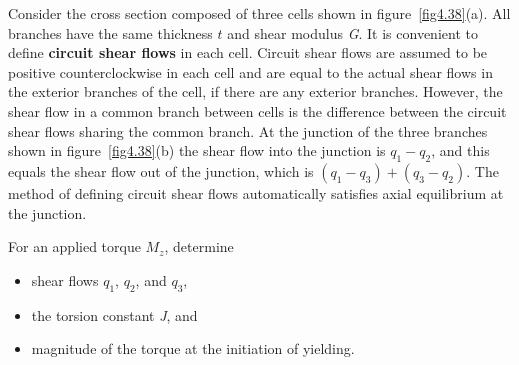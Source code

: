 \documentclass{AeroStructure-ERJohnson}
\begin{document}
\vspace*{-\baselineskip}
\begin{example}\label{ex4.11}\setcounter{equation}{0}\def\theequation{\alph{equation}}Consider the cross section composed of three cells shown in figure~\ref{fig4.38}(a). All branches have the same thickness $t$ and shear modulus \textit{G}. It is convenient to define \textbf{circuit shear flows} in each cell. Circuit shear flows are assumed to be positive counterclockwise in each cell and are equal to the actual shear flows in the exterior branches of the cell, if there are any exterior branches. However, the shear flow in a common branch between cells is the difference between the circuit shear flows sharing the common branch. At the junction of the three branches shown in figure~\ref{fig4.38}(b) the shear flow into the junction is $q_{1}-q_{2}$, and this equals the shear flow out of the junction, which is $\left(q_{1}-q_{3}\right)+\left(q_{3}-q_{2}\right)$. The method of defining circuit shear flows automatically satisfies axial equilibrium at the junction.

For an applied torque $M_{z}$, determine
\begin{itemize}
  \item shear flows $q_1$,  $q_2$, and $q_3$,
  \item the torsion constant \textit{J}, and
  \item magnitude of the torque at the initiation of yielding.
\end{itemize}


{\def\thefigure{4.38}
}



\end{example}
\end{document}
